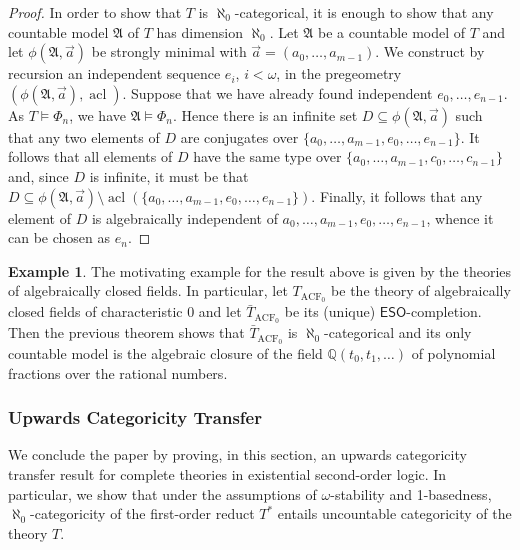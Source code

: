 \documentclass[a4paper]{amsart}
\theoremstyle{definition}
\newtheorem{example}[definition]{Example}
\theoremstyle{remark}
\newcommand{\A}{\mathcal{A}}
\DeclareMathOperator{\acl}{acl}
\newcommand\eso{\mathsf{ESO}}
\theoremstyle{definition}
\renewcommand{\A}{\mathfrak{A}}
\begin{document}
\begin{proof}
    In order to show that $T$ is $\aleph_0$-categorical, it is enough to show that any countable model $\A$ of $T$ has dimension $\aleph_0$. Let $\A$ be a countable model of $T$ and let $\phi(\A,\vec{a})$ be strongly minimal with $\vec{a}=(a_0,\dots,a_{m-1})$. We construct by recursion an independent sequence $e_i$, $i<\omega$, in the pregeometry $(\phi(\A,\vec{a}),\acl)$. Suppose that we have already found independent $e_0,\dots,e_{n-1}$. As $T\models\Phi_n$, we have $\A\models\Phi_n$. Hence there is an infinite set $D\subseteq\phi(\A,\vec{a})$ such that any two elements of $D$ are conjugates over $\{a_0,\dots,a_{m-1},e_0,\dots, e_{n-1}\}$. It follows that all elements of $D$ have the same type over $\{a_0,\dots,a_{m-1},c_0,\dots, c_{n-1}\}$ and, since $D$ is infinite, it must be that $D\subseteq\phi(\A,\vec{a})\setminus\acl(\{a_0,\dots,a_{m-1},e_0,\dots, e_{n-1}\})$. Finally, it follows that any element of $D$ is algebraically independent of $a_0,\dots,a_{m-1},e_0,\dots, e_{n-1}$, whence it can be chosen as $e_n$.
\end{proof}

\begin{example}
    The motivating example for the result above is given by the theories of algebraically closed fields. In particular, let $T_{\mathrm{ACF}_0}$ be the theory of algebraically closed fields of characteristic 0 and let $\bar T_{\mathrm{ACF}_0}$ be its (unique) $\eso$-completion. Then the previous theorem shows that $\bar T_{\mathrm{ACF}_0}$ is $\aleph_0$-categorical and its only countable model is the algebraic closure of the field $\mathbb Q(t_0,t_1,\dots)$ of polynomial fractions over the rational numbers.
\end{example}

\subsubsection{Upwards Categoricity Transfer}\label{section.upwards.categoricity}

We conclude the paper by proving, in this section, an upwards categoricity transfer result for complete theories in existential second-order logic. In particular, we show that under the assumptions of $\omega$-stability and 1-basedness, $\aleph_0$-categoricity of the first-order reduct $T^*$ entails uncountable categoricity of the theory $T$. 
\end{document}

